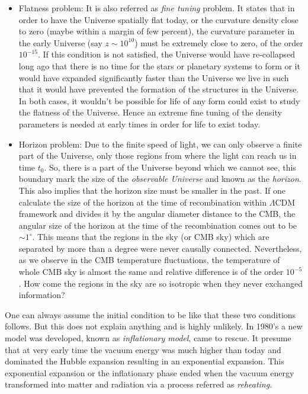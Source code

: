 \begin{itemize}
	\item Flatness problem: It is also referred as {\it fine tuning} problem. It 
				states that in order to have the Universe spatially flat today, or
				the curvature density close to zero (maybe within a margin of
				few percent), the curvature parameter in the early Universe (say 
				$z\sim10^{10}$) must be extremely close to zero, of the order $10^{-15}$.
				If this condition is not satisfied, the Universe would have re-collapsed
				long ago that there is no time for the stars or planetary systems to form
				or it would have expanded significantly faster than the Universe
				we live in such that it would have prevented the formation of the structures
				in the Universe. In both cases, it wouldn't be possible for life
				of any form could exist to study the flatness of the Universe. Hence
				an extreme fine tuning of the density parameters is needed at early
				times in order for life to exist today.

	\item Horizon problem: Due to the finite speed of light, we can only observe
				a finite part of the Universe, 
				only those regions from where the light can reach us
				in time $t_0$. So, there is a part of the Universe beyond which
				we cannot see, this boundary mark the size of the {\it observable Universe}
				and known as the {\it horizon}. This also implies that the horizon
				size must be smaller in the past. If one calculate the size of the
				horizon at the time of recombination within $\Lambda$CDM framework and
				divides it by the angular diameter distance to the CMB, the angular
				size of the horizon at the time of the recombination 
				comes out to be $\sim 1^{\circ}$. This means
				that the regions in the sky (or CMB sky) which are separated by 
				more than a degree were never causally connected. Nevertheless, as
				we observe in the CMB temperature fluctuations, the temperature of
				whole CMB sky is almost the same and relative difference is of the 
				order $10^{-5}$. How come the regions in the sky are so isotropic
				when they never exchanged information?
\end{itemize}

One can always assume the initial condition to be like that these two conditions
follows. But this does not explain anything and is highly unlikely. In 1980's 
a new model was developed, known as {\it inflationary model}, came to rescue. It presume
that at very early time the vacuum energy was much higher than today and dominated
the Hubble expansion resulting in an exponential expansion. This exponential
expansion or the inflationary phase ended when the vacuum energy transformed into
matter and radiation via a process referred as {\it reheating}.

